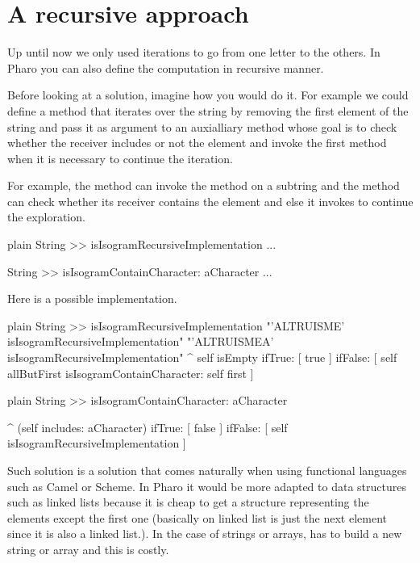 \documentclass[10pt,twoside,english]{_support/latex/sbabook/sbabook}
\begin{document}
\section{A recursive approach}
Up until now we only used iterations to go from one letter to the others. In Pharo you can also define 
the computation in recursive manner. 

Before looking at a solution, imagine how you would do it. For example we could define a method that iterates over the string by removing the first element of the string and pass it as argument to an auxialliary method whose goal is to check whether the receiver includes or not the element and invoke the first method when it is necessary to continue the iteration. 

For example, the method  can invoke the method  on a subtring and the method  can check whether its receiver contains the element and else it invokes  to continue the exploration. 

\begin{displaycode}{plain}
String >> isIsogramRecursiveImplementation
	...

String >> isIsogramContainCharacter: aCharacter
	...
\end{displaycode}

Here is a possible implementation. 

\begin{displaycode}{plain}
String >> isIsogramRecursiveImplementation
	"'ALTRUISME' isIsogramRecursiveImplementation"
	"'ALTRUISMEA' isIsogramRecursiveImplementation"
	^ self isEmpty
		ifTrue: [ true ] 
		ifFalse: [ self allButFirst isIsogramContainCharacter: self first ]
\end{displaycode}

\begin{displaycode}{plain}
String >> isIsogramContainCharacter: aCharacter
	
 	^ (self includes: aCharacter) 
			ifTrue: [ false ]
			ifFalse: [ self isIsogramRecursiveImplementation ]	 
\end{displaycode}

Such solution is a solution that comes naturally when using functional languages such as Camel or Scheme. 
In Pharo it would be more adapted to data structures such as linked lists because it is cheap to get a structure representing the elements except the first one (basically on linked list is just the next element since it is also a linked list.). In the case of strings or arrays,  has to build a new string or array and this is costly.
\end{document}
